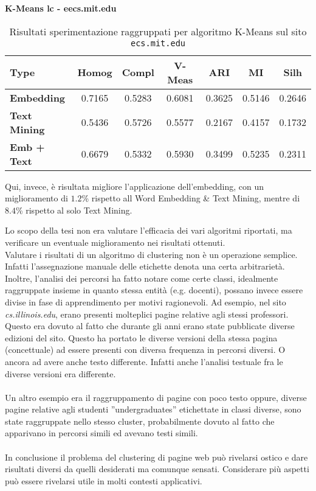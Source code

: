 \textbf{K-Means lc - eecs.mit.edu}
\begin{table}[H]
	\begin{tabular}{| l | c | c | c | c | c | c |}
	\hline
	\textbf{Type}  & \textbf{Homog} & \textbf{Compl} & \textbf{V-Meas}  & \textbf{ARI}  & \textbf{MI}  & \textbf{Silh} \\ [3ex] \hline
	\textbf{Embedding} & 0.7165 & 0.5283 & 0.6081 & 0.3625 & 0.5146 & 0.2646\\ [3ex]
	 \hline 
	\textbf{Text Mining} & 0.5436 & 0.5726 & 0.5577 & 0.2167 & 0.4157 & 0.1732\\ [3ex]
	 \hline
	\textbf{Emb + Text} & 0.6679 & 0.5332 & 0.5930 & 0.3499 & 0.5235 & 0.2311\\ [3ex]
	 \hline
	\end{tabular}
	\caption{Risultati sperimentazione raggruppati per algoritmo K-Means sul sito \texttt{ecs.mit.edu}}
	\label{metricheTextEmbedKmeansLcMit}
\end{table}

Qui, invece, è risultata migliore l'applicazione dell'embedding, con un miglioramento di $1.2$\% rispetto all Word Embedding \& Text Mining, mentre di $8.4$\% rispetto al solo Text Mining.

Lo scopo della tesi non era valutare l'efficacia dei vari algoritmi riportati, ma verificare un eventuale miglioramento nei risultati ottenuti.
\\
Valutare i risultati di un algoritmo di clustering non è un operazione semplice. Infatti l'assegnazione manuale delle etichette denota una certa arbitrarietà. 
\\
Inoltre, l'analisi dei percorsi ha fatto notare come certe classi, idealmente raggruppate insieme in quanto stessa entità (e.g. docenti), possano invece essere divise in fase di apprendimento per motivi ragionevoli. Ad esempio, nel sito \textit{cs.illinois.edu}, erano presenti molteplici pagine relative agli stessi professori. Questo era dovuto al fatto che durante gli anni erano state pubblicate diverse edizioni del sito. Questo ha portato le diverse versioni della stessa pagina (concettuale) ad essere presenti con diversa frequenza in percorsi diversi. O ancora ad avere anche testo differente. Infatti anche l'analisi testuale fra le diverse versioni era differente. 
\\\\
Un altro esempio era il raggruppamento di pagine con poco testo oppure, diverse pagine relative agli studenti ''undergraduates'' etichettate in classi diverse, sono state raggruppate nello stesso cluster, probabilmente dovuto al fatto che apparivano in percorsi simili ed avevano testi simili.
\\\\
In conclusione il problema del clustering di pagine web può rivelarsi ostico e dare risultati diversi da quelli desiderati ma comunque sensati. Considerare più aspetti può essere rivelarsi utile in molti contesti applicativi.

